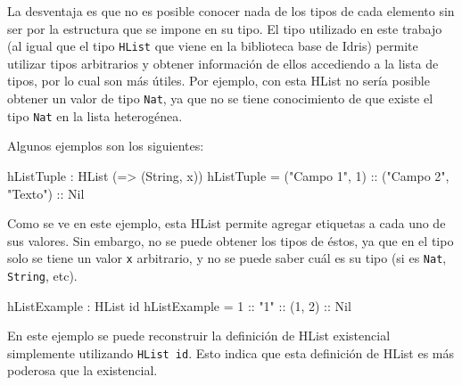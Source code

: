 La desventaja es que no es posible conocer nada de los tipos de cada elemento sin ser por la estructura que se impone en su tipo. El tipo utilizado en este trabajo (al igual que el tipo \texttt{HList} que viene en la biblioteca base de Idris) permite utilizar tipos arbitrarios y obtener información de ellos accediendo a la lista de tipos, por lo cual son más útiles. Por ejemplo, con esta HList no sería posible obtener un valor de tipo \texttt{Nat}, ya que no se tiene conocimiento de que existe el tipo \texttt{Nat} en la lista heterogénea.

Algunos ejemplos son los siguientes:

\begin{code}
hListTuple : HList (\x => (String, x))
hListTuple = ("Campo 1", 1) :: ("Campo 2", "Texto") :: Nil
\end{code}

Como se ve en este ejemplo, esta HList permite agregar etiquetas a cada uno de sus valores. Sin embargo, no se puede obtener los tipos de éstos, ya que en el tipo solo se tiene un valor \texttt{x} arbitrario, y no se puede saber cuál es su tipo (si es \texttt{Nat}, \texttt{String}, etc).

\begin{code}
hListExample : HList id
hListExample = 1 :: "1" :: (1, 2) :: Nil
\end{code}

En este ejemplo se puede reconstruir la definición de HList existencial simplemente utilizando \texttt{HList id}. Esto indica que esta definición de HList es más poderosa que la existencial.
